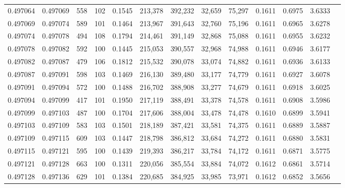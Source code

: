 \begin{tabular}{rrrrrrrrrrrrr}
0.497064 & 0.497069 &   558 & 102 &                                     0.1545 & 213,378 & 392,232 &  32,659 &  75,297 & 0.1611 & 0.6975 & 3.6333 \\
0.497069 & 0.497074 &   589 & 101 &                                     0.1464 & 213,967 & 391,643 &  32,760 &  75,196 & 0.1611 & 0.6965 & 3.6278 \\
0.497074 & 0.497078 &   494 & 108 &                                     0.1794 & 214,461 & 391,149 &  32,868 &  75,088 & 0.1611 & 0.6955 & 3.6232 \\
0.497078 & 0.497082 &   592 & 100 &                                     0.1445 & 215,053 & 390,557 &  32,968 &  74,988 & 0.1611 & 0.6946 & 3.6177 \\
0.497082 & 0.497087 &   479 & 106 &                                     0.1812 & 215,532 & 390,078 &  33,074 &  74,882 & 0.1611 & 0.6936 & 3.6133 \\
0.497087 & 0.497091 &   598 & 103 &                                     0.1469 & 216,130 & 389,480 &  33,177 &  74,779 & 0.1611 & 0.6927 & 3.6078 \\
0.497091 & 0.497094 &   572 & 100 &                                     0.1488 & 216,702 & 388,908 &  33,277 &  74,679 & 0.1611 & 0.6918 & 3.6025 \\
0.497094 & 0.497099 &   417 & 101 &                                     0.1950 & 217,119 & 388,491 &  33,378 &  74,578 & 0.1611 & 0.6908 & 3.5986 \\
0.497099 & 0.497103 &   487 & 100 &                                     0.1704 & 217,606 & 388,004 &  33,478 &  74,478 & 0.1610 & 0.6899 & 3.5941 \\
0.497103 & 0.497109 &   583 & 103 &                                     0.1501 & 218,189 & 387,421 &  33,581 &  74,375 & 0.1611 & 0.6889 & 3.5887 \\
0.497109 & 0.497115 &   609 & 103 &                                     0.1447 & 218,798 & 386,812 &  33,684 &  74,272 & 0.1611 & 0.6880 & 3.5831 \\
0.497115 & 0.497121 &   595 & 100 &                                     0.1439 & 219,393 & 386,217 &  33,784 &  74,172 & 0.1611 & 0.6871 & 3.5775 \\
0.497121 & 0.497128 &   663 & 100 &                                     0.1311 & 220,056 & 385,554 &  33,884 &  74,072 & 0.1612 & 0.6861 & 3.5714 \\
0.497128 & 0.497136 &   629 & 101 &                                     0.1384 & 220,685 & 384,925 &  33,985 &  73,971 & 0.1612 & 0.6852 & 3.5656 \\

\end{tabular}
